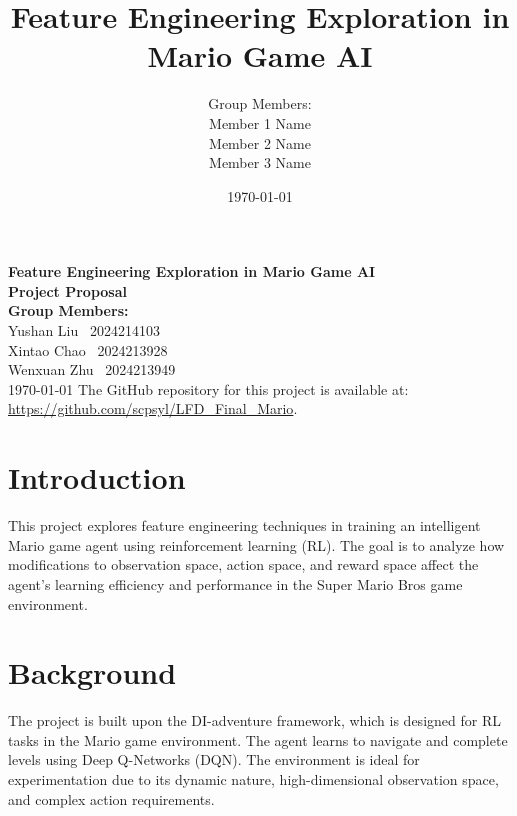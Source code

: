 \documentclass[12pt]{article}
\title{\textbf{Feature Engineering Exploration in Mario Game AI}}
\author{
    Group Members: \\
    Member 1 Name \\
    Member 2 Name \\
    Member 3 Name
}
\date{\today}
\begin{document}
\begin{titlepage}
    \centering
    \vspace*{1.5cm}
    {\Huge \textbf{Feature Engineering Exploration in Mario Game AI}} \\
    \vspace{2cm}
    \Large \textbf{Project Proposal} \\
    \vspace{3cm}
    \textbf{Group Members:} \\ 
    \vspace{1cm}
    Yushan Liu \ 2024214103 \\
    Xintao Chao \ 2024213928 \\
    Wenxuan Zhu \ 2024213949 \\
    \vspace{2cm}
    \today
    \vfill
    The GitHub repository for this project is available at: \url{https://github.com/scpsyl/LFD_Final_Mario}.
\end{titlepage}

\newpage


\section*{Introduction}
This project explores feature engineering techniques in training an intelligent Mario game agent using reinforcement learning (RL). The goal is to analyze how modifications to observation space, action space, and reward space affect the agent’s learning efficiency and performance in the Super Mario Bros game environment.

\section*{Background}
The project is built upon the DI-adventure framework, which is designed for RL tasks in the Mario game environment. The agent learns to navigate and complete levels using Deep Q-Networks (DQN). The environment is ideal for experimentation due to its dynamic nature, high-dimensional observation space, and complex action requirements.
\end{document}

